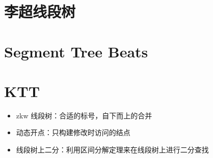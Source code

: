 \section{李超线段树}

\section{Segment Tree Beats}

\section{KTT}

\begin{summary}
    \begin{itemize}
    \item zkw 线段树：合适的标号，自下而上的合并
    \item 动态开点：只构建修改时访问的结点
    \item 线段树上二分：利用区间分解定理来在线段树上进行二分查找
    \end{itemize}
\end{summary}